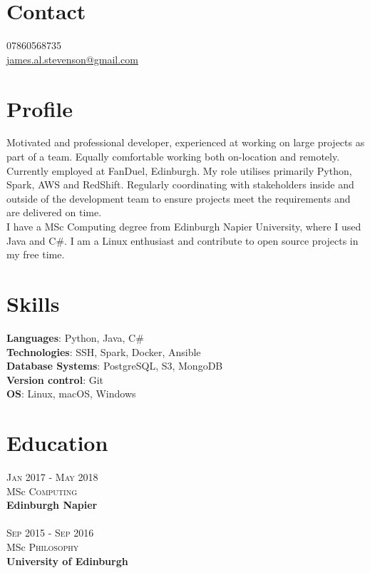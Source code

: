 \documentclass[14pt, a4paper]{extarticle}
\begin{document}
\par{\bigskip\par
\section{Contact}
\large
07860568735\\
\href{mailto:james.al.stevenson@gmail.com}{james.al.stevenson@gmail.com}\\
}

\begin{multicols}{2}

\section{Profile}
\noindent Motivated and professional developer, experienced at working on large projects as part of a team. Equally comfortable working both on-location and remotely.\\
Currently employed at FanDuel, Edinburgh. My role utilises primarily Python, Spark, AWS and RedShift. Regularly coordinating with stakeholders inside and outside of the development team to ensure projects meet the requirements and are delivered on time.\\
I have a MSc Computing degree from Edinburgh Napier University, where I used Java and C\#. I am a Linux enthusiast and contribute to open source projects in my free time.

\section{Skills}
\noindent\textbf{Languages}: Python, Java, C\#\\
\textbf{Technologies}: SSH, Spark, Docker, Ansible\\
\textbf{Database Systems}: PostgreSQL, S3, MongoDB\\
\textbf{Version control}: Git\\
\textbf{OS}: Linux, macOS, Windows

\section{Education}
\noindent\textsc{Jan} 2017 - \textsc{May} 2018\\
MSc \textsc{Computing} \\
\textbf{Edinburgh Napier}\\~\\
\textsc{Sep} 2015 - \textsc{Sep} 2016\\
MSc \textsc{Philosophy} \\
\textbf{University of Edinburgh}


\end{multicols}
\end{document}
